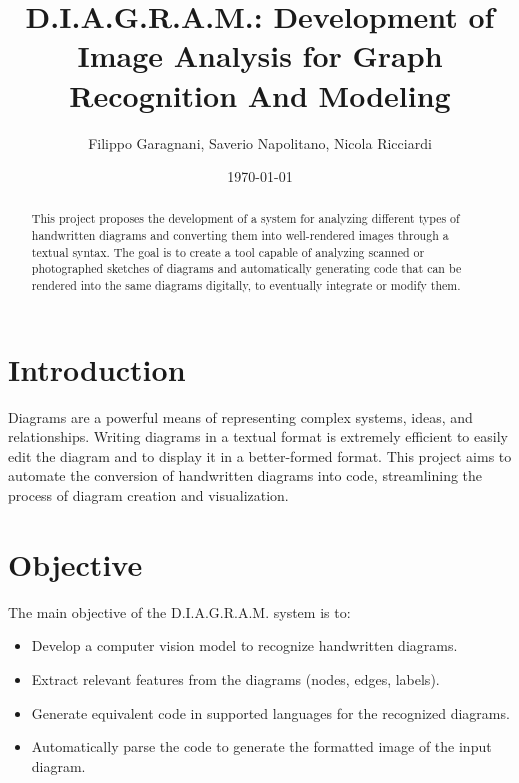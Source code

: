 \documentclass[a4paper,12pt]{article}
\title{D.I.A.G.R.A.M.: Development of Image Analysis for Graph Recognition And Modeling}
\author{Filippo Garagnani, Saverio Napolitano, Nicola Ricciardi}
\date{\today}
\begin{document}
\maketitle

\begin{abstract}
    This project proposes the development of a system for analyzing different types of handwritten diagrams and converting them into well-rendered images through a textual syntax. The goal is to create a tool capable of analyzing scanned or photographed sketches of diagrams and automatically generating code that can be rendered into the same diagrams digitally, to eventually integrate or modify them.
\end{abstract}

\section{Introduction}
    Diagrams are a powerful means of representing complex systems, ideas, and relationships. Writing diagrams in a textual format is extremely efficient to easily edit the diagram and to display it in a better-formed format. This project aims to automate the conversion of handwritten diagrams into code, streamlining the process of diagram creation and visualization.

\section{Objective}
    The main objective of the D.I.A.G.R.A.M. system is to:
    \begin{itemize}
        \item Develop a computer vision model to recognize handwritten diagrams.
        \item Extract relevant features from the diagrams (nodes, edges, labels).
        \item Generate equivalent code in supported languages for the recognized diagrams.
        \item Automatically parse the code to generate the formatted image of the input diagram.
    \end{itemize}
    
\end{document}
